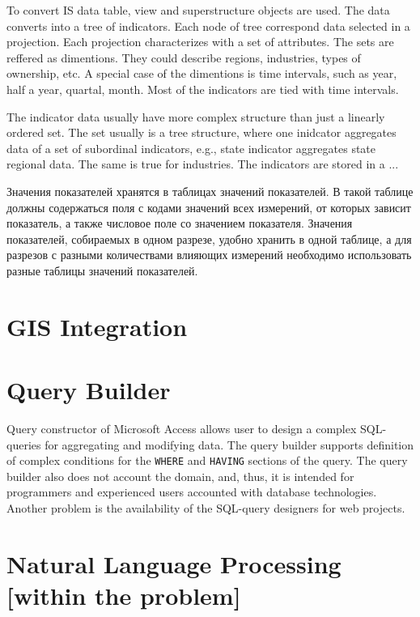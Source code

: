 \documentclass[conference]{IEEEtran}
\begin{document}
To convert IS data {table}, {view} and {superstructure} objects are used.  The data converts into a tree of indicators.  Each node of tree correspond data selected in a projection.  Each projection characterizes with a set of attributes.  The sets are reffered as dimentions.  They could describe regions, industries, types of ownership, etc.  A special case of the dimentions is time intervals, such as year, half a year, quartal, month.  Most of the indicators are tied with time intervals.

The indicator data usually have more complex structure than just a linearly ordered set.  The set usually is a tree structure, where one inidcator aggregates data of a set of subordinal indicators, e.g., state indicator aggregates state regional data.  The same is true for industries.  The indicators are stored in a ...


Значения показателей хранятся в таблицах значений показателей. В такой таблице должны содержаться поля с кодами значений всех измерений, от которых зависит показатель, а также числовое поле со значением показателя. Значения показателей, собираемых в одном разрезе, удобно хранить в одной таблице, а для разрезов с разными количествами влияющих измерений необходимо использовать разные таблицы значений показателей.


\section{GIS Integration}
\label{sec:gis-integration}



\section{Query Builder}
\label{sec:query-builder}


Query constructor of Microsoft Access allows user to design a complex SQL-queries for aggregating and modifying data.  The query builder supports definition of complex conditions for the \texttt{WHERE} and \texttt{HAVING} sections of the query.  The query builder also does not account the domain, and, thus, it is intended for programmers and experienced users accounted with database technologies.  Another problem is the availability of the SQL-query designers for web projects.


\section{Natural Language Processing [within the problem]}
\label{sec:natur-lang-proc}
\end{document}
